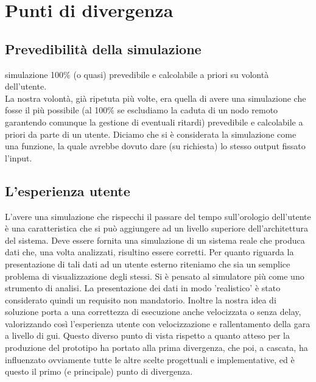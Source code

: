 \section{Punti di divergenza}
\subsection{Prevedibilità della simulazione}
simulazione 100\% (o quasi) prevedibile e calcolabile a priori su volontà dell’utente.\\
La nostra volontà, già ripetuta più volte, era quella di avere una simulazione che fosse il più possibile (al 100\% se escludiamo la caduta di un nodo remoto garantendo comunque la gestione di eventuali ritardi) prevedibile e calcolabile a priori da parte di un utente. Diciamo che si è considerata la simulazione come una funzione, la quale avrebbe dovuto dare (su richiesta) lo stesso output fissato l'input.
\subsection{L'esperienza utente}
L’avere una simulazione che rispecchi il passare del tempo sull’orologio dell’utente è una caratteristica che si può aggiungere ad un livello superiore dell’architettura del sistema. Deve essere fornita una simulazione di un sistema reale che produca dati che, una volta analizzati, risultino essere corretti. Per quanto riguarda la presentazione di tali dati ad un utente esterno riteniamo che sia un semplice problema di visualizzazione degli stessi. Si è pensato al simulatore più come uno strumento di analisi. La presentazione dei dati in modo 'realistico' è stato considerato quindi un requisito non mandatorio. Inoltre la nostra idea di soluzione porta a una  correttezza di esecuzione anche velocizzata o senza delay, valorizzando così l’esperienza utente con velocizzazione e rallentamento della gara a livello di gui.
Questo diverso punto di vista rispetto a quanto atteso per la produzione del prototipo ha portato alla prima divergenza, che poi, a cascata, ha influenzato ovviamente tutte le altre scelte progettuali e implementative, ed è questo il primo (e principale) punto di divergenza.
